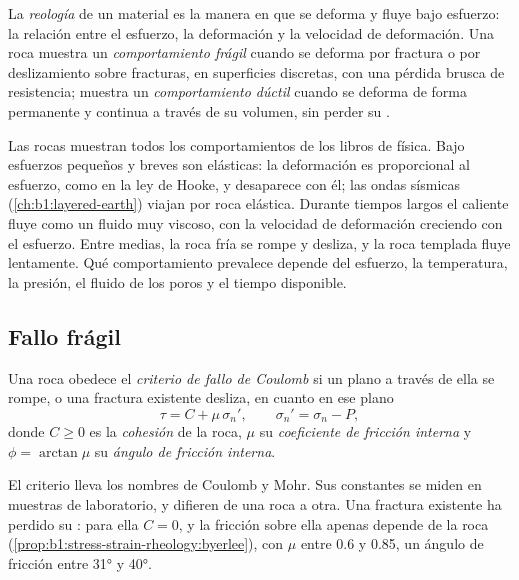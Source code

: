 \begin{definition}\label{def:b1:stress-strain-rheology:rheology}
La \emph{reología} de un material es la manera en que se deforma y fluye bajo esfuerzo: la relación entre el esfuerzo, la deformación y la
velocidad de deformación. Una roca muestra un \emph{comportamiento frágil} cuando se deforma por fractura o por deslizamiento sobre
fracturas, en superficies discretas, con una pérdida brusca de resistencia; muestra un \emph{comportamiento dúctil} cuando se deforma
de forma permanente y continua a través de su volumen, sin perder su .
\end{definition}

Las rocas muestran todos los comportamientos de los libros de física. Bajo esfuerzos pequeños y breves son elásticas: la deformación es proporcional al
esfuerzo, como en la ley de Hooke, y desaparece con él; las ondas sísmicas (\cref{ch:b1:layered-earth}) viajan por roca elástica. Durante tiempos largos el
 caliente fluye como un fluido muy viscoso, con la velocidad de deformación creciendo con el esfuerzo. Entre medias, la roca fría se rompe y desliza, y
la roca templada fluye lentamente. Qué comportamiento prevalece depende del esfuerzo, la temperatura, la presión, el fluido de los poros y el tiempo disponible.

\subsection*{Fallo frágil}

\begin{definition}\label{def:b1:stress-strain-rheology:coulomb}
Una roca obedece el \emph{criterio de fallo de Coulomb} si un plano a través de ella se rompe, o una fractura existente
desliza, en cuanto en ese plano
\[
  \tau = C + \mu\,\sigma_n' , \qquad \sigma_n' = \sigma_n - P ,
\]
donde $C \ge 0$ es la \emph{cohesión} de la roca, $\mu$ su \emph{coeficiente de fricción interna}
y $\phi = \arctan\mu$ su \emph{ángulo de fricción interna}.
\end{definition}

El criterio lleva los nombres de Coulomb y Mohr. Sus constantes se miden en muestras de laboratorio, y difieren de una roca a otra. Una fractura existente ha perdido
su : para ella $C = 0$, y la fricción sobre ella apenas depende de la roca (\cref{prop:b1:stress-strain-rheology:byerlee}), con $\mu$ entre 0.6 y 0.85,
un ángulo de fricción entre \ang{31} y \ang{40}.

